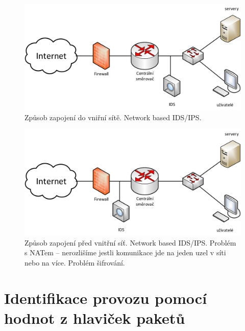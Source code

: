 \begin{figure}[H]
    \centering
    \includegraphics[width=0.75\linewidth]{zpusob_zapojeni_1.png}
    \caption{Způsob zapojení do vniřní sítě. Network based IDS/IPS. }
\end{figure}

\begin{figure}[H]
    \centering
    \includegraphics[width=0.75\linewidth]{zpusob_zapojeni_2.png}
    \caption{Způsob zapojení před vnitřní síť. Network based IDS/IPS. Problém s NATem -- nerozlišíme jestli komunikace jde na jeden uzel v síti nebo na více. Problém šifrování.}
\end{figure}


\section{Identifikace provozu pomocí hodnot z hlaviček paketů}

